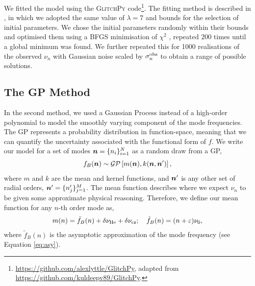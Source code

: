 We fitted the model using the \textsc{GlitchPy} code\footnote{\url{https://github.com/alexlyttle/GlitchPy}, adapted from \url{https://github.com/kuldeepv89/GlitchPy}.}. The fitting method is described in \citet{Verma.Raodeo.ea2019}, in which we adopted the same value of \(\lambda=7\) and bounds for the selection of initial parameters. We chose the initial parameters randomly within their bounds and optimised them using a BFGS minimisation of \(\chi^2\) \citep{Fletcher1987}, repeated 200 times until a global minimum was found. We further repeated this for 1000 realisations of the observed \(\nu_n\) with Gaussian noise scaled by \(\sigma_n^{{\mathrm{obs}}}\) to obtain a range of possible solutions.

\subsection{The GP Method}

In the second method, we used a Gaussian Process \citep[GP; see][for a recent review]{Aigrain.Foreman-Mackey2022} instead of a high-order polynomial to model the smoothly varying component of the mode frequencies. The GP represents a probability distribution in function-space, meaning that we can quantify the uncertainty associated with the functional form of $f$. We write our model for a set of modes \(\bm{n} = \{n_i\}_{i=1}^N\) as a random draw from a GP,
%
\begin{equation}
    f_{B}(\vect{n}) \sim \mathcal{GP}\left[ m(\vect{n}), k(\vect{n}, \vect{n}') \right],%
\end{equation}
%
where \(m\) and \(k\) are the mean and kernel functions, and \(\bm{n}'\) is any other set of radial orders, \(\bm{n}' = \{n'_j\}_{j=1}^M\). The mean function describes where we expect \(\nu_n\) to be given some approximate physical reasoning. Therefore, we define our mean function for any \(n\)-th order mode as,
%
\begin{equation}
    m(n) = \tilde{f}_B(n) + \delta\nu_{{\mathrm{He}}} + \delta\nu_{{\mathrm{cz}}}; \quad \tilde{f}_B(n) = (n + \varepsilon) \nu_0, \label{eq:asy-glitch}
\end{equation}
%
where \(\tilde{f}_B(n)\) is the asymptotic approximation of the mode frequency (see Equation \ref{eq:asy}).

